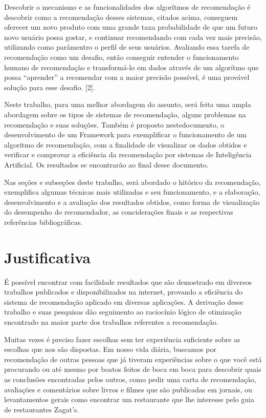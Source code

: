 \documentclass[12pt,
				openright,
				twoside,
				a4paper,
				apter=TITLE,
				section=TITLE,
				subsection=TITLE,
				chapter=TITLE,
				english,
				brazil]{abntex2}
\begin{document}
Descobrir o mecanismo e as funcionalidades dos algorítmos de recomendação é descobrir como a recomendação desses sistemas, citados acima, conseguem oferecer um novo produto com uma grande taxa probabilidade de que um futuro novo usuário possa gostar, e continuar recomendando com cada vez mais precisão, utilizando como parâmentro o perfil de seus usuários. Avaliando essa tarefa de recomendação como um desafio, então conseguir entender o funcionamento humano de recomendação e transformá-lo em dados através de um algorítmo que possa ``aprender'' a recomendar com a maior precisão possível, é uma provável solução para esse desafio. [2].

Neste trabalho, para uma melhor abordagem do assunto, será feita uma ampla abordagem sobre os tipos de sistemas de recomendação, alguns problemas na recomendação e suas soluções. Também é proposto nestedocumento, o desenvolvimento de um Framework para exemplificar o funcionamento de um algoritmo de recomendação, com a finalidade de visualizar os dados obtidos e verificar e comprovar a eficiência da recomendação por sistemas de Inteligência Artificial. Os resultados se encontrarão ao final desse documento.

Nas seções e subseções deste trabalho, será abordado o hitórico da recomendação, exemplifica algumas técnicas mais utilizadas e seu funcionamento, e a elaboração, desenvolvimento e a avaliação dos resultados obtidos, como forma de visualização do desempenho do recomendador, as conciderações finais e as respectivas referências bibliográficas. 

\section{Justificativa}
É possível encontrar com facilidade resultados que são demostrado em diversos trabalhos publicados e disponibilizados na internet, provando a eficiência do sistema de recomendação aplicado em diversas aplicações. A derivação desse trabalho e suas pesquisas dão seguimento ao raciocínio lógico de otimização encontrado na maior parte dos trabalhos referentes a recomendação. 

\begin{citacao}
Muitas vezes é preciso fazer escolhas sem ter experiência suficiente sobre as escolhas que nos são dispostas. Em nosso vida diária, buscamos por recomendação de outras pessoas que já tiveram experiências sobre o que você está procurando ou até mesmo por boatos feitos de boca em boca para descobrir quais as conclusões encontradas pelos outros, como pedir uma carta de recomendação, avaliações e comentários sobre livros e filmes que são publicadas em jornais, ou levantamentos gerais como encontrar um restaurante que lhe interesse pelo guia de restaurantes Zagat’s.
\cite{resnick1997recommender}
\end{citacao}
\end{document}
